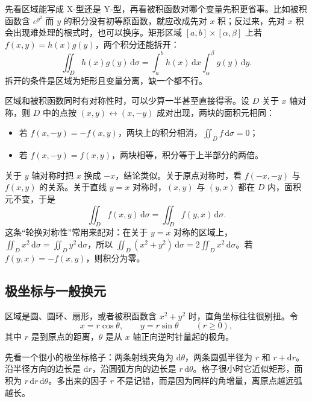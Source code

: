 先看区域能写成 X-型还是 Y-型，再看被积函数对哪个变量先积更省事。比如被积函数含 $e^{y^2}$ 而 $y$ 的积分没有初等原函数，就应改成先对 $x$ 积；反过来，先对 $x$ 积会出现难处理的根式时，也可以换序。矩形区域 $[a,b]\times[\alpha,\beta]$ 上若 $f(x,y)=h(x)g(y)$，两个积分还能拆开：
\[
    \iint_D h(x)g(y)\,\mathrm d\sigma
    =\int_a^b h(x)\,\mathrm dx\int_\alpha^\beta g(y)\,\mathrm dy .
\]
拆开的条件是区域为矩形且变量分离，缺一个都不行。

区域和被积函数同时有对称性时，可以少算一半甚至直接得零。设 $D$ 关于 $x$ 轴对称，则 $D$ 中的点按 $(x,y)\leftrightarrow(x,-y)$ 成对出现，两块的面积元相同：

\begin{itemize}
  \item 若 $f(x,-y)=-f(x,y)$，两块上的积分相消，$\iint_D f\,\mathrm d\sigma=0$；
  \item 若 $f(x,-y)=f(x,y)$，两块相等，积分等于上半部分的两倍。
\end{itemize}
关于 $y$ 轴对称时把 $x$ 换成 $-x$，结论类似。关于原点对称时，看 $f(-x,-y)$ 与 $f(x,y)$ 的关系。关于直线 $y=x$ 对称时，$(x,y)$ 与 $(y,x)$ 都在 $D$ 内，面积元不变，于是
\[
    \iint_D f(x,y)\,\mathrm d\sigma=\iint_D f(y,x)\,\mathrm d\sigma .
\]
这条“轮换对称性”常用来配对：在关于 $y=x$ 对称的区域上，$\iint_D x^2\,\mathrm d\sigma=\iint_D y^2\,\mathrm d\sigma$，所以 $\iint_D(x^2+y^2)\,\mathrm d\sigma=2\iint_D x^2\,\mathrm d\sigma$。若 $f(y,x)=-f(x,y)$，则积分为零。
\subsection{极坐标与一般换元}

区域是圆、圆环、扇形，或者被积函数含 $x^2+y^2$ 时，直角坐标往往很别扭。令
\[
    x=r\cos\theta,\qquad y=r\sin\theta\qquad(r\ge0),
\]
其中 $r$ 是到原点的距离，$\theta$ 是从 $x$ 轴正向逆时针量起的极角。

先看一个很小的极坐标格子：两条射线夹角为 $\mathrm d\theta$，两条圆弧半径为 $r$ 和 $r+\mathrm dr$。沿半径方向的边长是 $\mathrm dr$，沿圆弧方向的边长是 $r\,\mathrm d\theta$。格子很小时它近似矩形，面积为 $r\,\mathrm dr\,\mathrm d\theta$。多出来的因子 $r$ 不是记错，而是因为同样的角增量，离原点越远弧越长。

